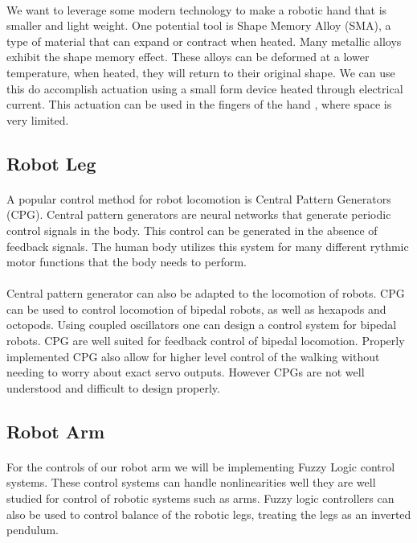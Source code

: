\documentclass[letterpaper,12pt]{article}
\begin{document}
\paragraph{}We want to leverage some modern technology to make a robotic hand
that is smaller and light weight. One potential tool is Shape Memory Alloy
(SMA), a type of material that can expand or contract when
heated\cite{Schetky1982}. Many metallic alloys exhibit the shape memory
effect\cite{Wayman1993}. These alloys can be deformed at a lower temperature,
when heated, they will return to their original shape. We can use this do
accomplish actuation using a small form device heated through electrical
current\cite{Ikuta1990}. This actuation can be used in the fingers of the hand
, where space is very limited.

\subsection{Robot Leg}
\paragraph{}A popular control method for robot locomotion is Central Pattern
Generators (CPG). Central pattern generators are neural networks that generate
periodic control signals in the body. This control can be generated in the
absence of feedback signals. The human body utilizes this
system for many different rythmic motor functions that the body needs to
perform\cite{cpggeneral}. 

\paragraph{}Central pattern generator can also be adapted to the locomotion of
robots. CPG can be used to control locomotion of bipedal robots, as well as
hexapods and octopods. Using coupled oscillators one can design a control system
for bipedal robots. CPG are well suited for feedback control of bipedal
locomotion. Properly implemented CPG also allow for higher level control of the
walking without needing to worry about exact servo outputs. However CPGs are not
well understood and difficult to design properly\cite{Ijspeert2008}.

\subsection{Robot Arm}
\paragraph{}For the controls of our robot arm we will be implementing Fuzzy
Logic control systems. These control systems can handle nonlinearities well they
are well studied for control of robotic systems such as arms\cite{Scharf1985}.
Fuzzy logic controllers can also be used to control balance of the robotic legs,
treating the legs as an inverted pendulum\cite{hwang1992stability}.
\end{document}
